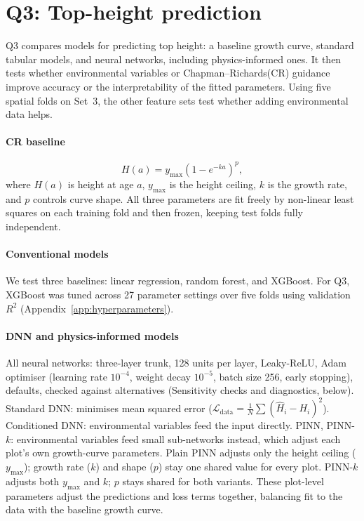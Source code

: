 \documentclass[logo,msc,ai]{infthesis}           %
\begin{document}
\section{Q3: Top-height prediction}
Q3 compares models for predicting top height: a baseline growth curve, standard tabular models, and neural networks, including physics-informed ones. It then tests whether environmental variables or Chapman--Richards(CR) guidance improve accuracy or the interpretability of the fitted parameters. Using five spatial folds on Set~3, the other feature sets test whether adding environmental data helps.

\paragraph*{CR baseline}
\begin{equation}
H(a) = y_{\max}\left(1 - e^{-ka}\right)^p,
\label{eq:cr}
\end{equation}
where $H(a)$ is height at age $a$, $y_{\max}$ is the height ceiling, $k$ is the growth rate, and $p$ controls curve shape. All three parameters are fit freely by non-linear least squares on each training fold and then frozen, keeping test folds fully independent.

\paragraph*{Conventional models}
We test three baselines: linear regression, random forest, and XGBoost. For Q3, XGBoost was tuned across 27 parameter settings over five folds using validation $R^2$ (Appendix~\ref{app:hyperparameters}).

\paragraph*{DNN and physics-informed models}
All neural networks: three-layer trunk, 128 units per layer, Leaky-ReLU, Adam optimiser (learning rate $10^{-4}$, weight decay $10^{-5}$, batch size 256, early stopping), defaults, checked against alternatives (Sensitivity checks and diagnostics, below). Standard DNN: minimises mean squared error ($\mathcal{L}_{\mathrm{data}} = \frac{1}{N}\sum (\hat H_i-H_i)^2$). Conditioned DNN: environmental variables feed the input directly. PINN, PINN-$k$: environmental variables feed small sub-networks instead, which adjust each plot's own growth-curve parameters. Plain PINN adjusts only the height ceiling ($y_{\max}$); growth rate ($k$) and shape ($p$) stay one shared value for every plot. PINN-$k$ adjusts both $y_{\max}$ and $k$; $p$ stays shared for both variants. These plot-level parameters adjust the predictions and loss terms together, balancing fit to the data with the baseline growth curve.
\end{document}
